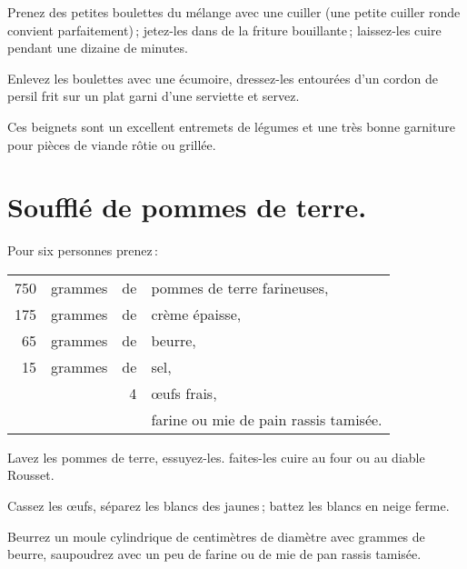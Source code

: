 Prenez des petites boulettes du mélange avec une cuiller (une petite cuiller
ronde convient parfaitement) ; jetez-les dans de la friture bouillante ;
laissez-les cuire pendant une dizaine de minutes.

Enlevez les boulettes avec une écumoire, dressez-les entourées d'un cordon de
persil frit sur un plat garni d'une serviette et servez.

\medskip

Ces beignets sont un excellent entremets de légumes et une très bonne garniture
pour pièces de viande rôtie ou grillée.

\section*{\centering Soufflé de pommes de terre.}
{}

Pour six personnes prenez :

\footnotesize
\begin{longtable}{rrrp{16em}}
    750 & grammes & de & pommes de terre farineuses,                                                      \\
    175 & grammes & de & crème épaisse,                                                                   \\
     65 & grammes & de & beurre,                                                                          \\
     15 & grammes & de & sel,                                                                             \\
        &         &  4 & œufs frais,                                                                      \\
        &         &    & farine ou mie de pain rassis tamisée.                                            \\
\end{longtable}
\normalsize

Lavez les pommes de terre, essuyez-les. faites-les cuire au four ou au diable
Rousset.

Cassez les œufs, séparez les blancs des jaunes ; battez les blancs en neige
ferme.

Beurrez un moule cylindrique de {\mmm} centimètres de diamètre avec
{\mmm} grammes de beurre, saupoudrez avec un peu de farine ou de mie de
pan rassis tamisée.

